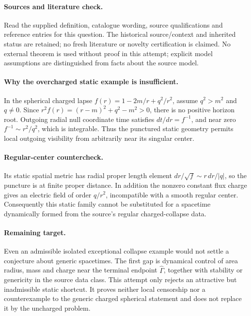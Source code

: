 \documentclass[11pt]{article}
\begin{document}
\paragraph{Sources and literature check.}
Read the supplied definition, catalogue wording, source qualifications and reference entries for this question. The historical source/context and inherited status are retained; no fresh literature or novelty certification is claimed. No external theorem is used without proof in this attempt; explicit model assumptions are distinguished from facts about the source model.

\paragraph{Why the overcharged static example is insufficient.} In the spherical charged lapse \(f(r)=1-2m/r+q^2/r^2\), assume \(q^2>m^2\) and \(q\ne0\). Since \(r^2f(r)=(r-m)^2+q^2-m^2>0\), there is no positive horizon root. Outgoing radial null coordinate time satisfies \(dt/dr=f^{-1}\), and near zero \(f^{-1}\sim r^2/q^2\), which is integrable. Thus the punctured static geometry permits local outgoing visibility from arbitrarily near its singular center.
\paragraph{Regular-center countercheck.} Its static spatial metric has radial proper length element \(dr/\sqrt f\sim r\,dr/|q|\), so the puncture is at finite proper distance. In addition the nonzero constant flux charge gives an electric field of order \(q/r^2\), incompatible with a smooth regular center. Consequently this static family cannot be substituted for a spacetime dynamically formed from the source's regular charged-collapse data.
\paragraph{Remaining target.} Even an admissible isolated exceptional collapse example would not settle a conjecture about generic spacetimes. The first gap is dynamical control of area radius, mass and charge near the terminal endpoint \(\widehat\Gamma\), together with stability or genericity in the source data class. This attempt only rejects an attractive but inadmissible static shortcut. It proves neither local censorship nor a counterexample to the generic charged spherical statement and does not replace it by the uncharged problem.
\end{document}
